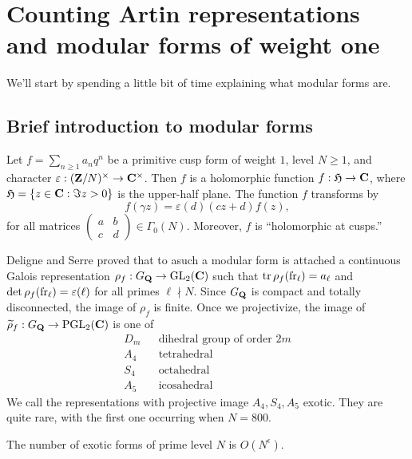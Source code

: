 
\section{Counting Artin representations and modular forms of weight one}





We'll start by spending a little bit of time explaining what modular forms are. 





\subsection{Brief introduction to modular forms}

Let $f = \sum_{n\geqslant 1} a_n q^n$ be a primitive cusp form of weight $1$, 
level $N\geqslant 1$, and character 
$\varepsilon:(\mathbf{Z}/N)^\times \to \mathbf{C}^\times$. Then $f$ is a holomorphic function 
$f:\mathfrak{H}\to \mathbf{C}$, where $\mathfrak{H}=\{z\in \mathbf{C}:\Im z>0\}$ is the upper-half plane. The 
function $f$ transforms by 
\[
  f(\gamma z) = \varepsilon(d) (c z+d) f(z) ,
\]
for all matrices $\begin{pmatrix} a & b \\ c & d \end{pmatrix}\in \Gamma_0(N)$. 
Moreover, $f$ is ``holomorphic at cusps.'' 

Deligne and Serre proved that to asuch a modular form is attached a continuous 
Galois representation $\rho_f:G_{\mathbf{Q}} \to \operatorname{GL}_2(\mathbf{C})$ such that 
$\operatorname{tr} \rho_f(\operatorname{fr}_\ell) = a_\ell$ and 
$\det\rho_f(\operatorname{fr}_\ell) = \varepsilon(\ell)$ for all primes $\ell\nmid N$. 
Since $G_{\mathbf{Q}}$ is compact and totally disconnected, the image of $\rho_f$ is 
finite. Once we projectivize, the image of 
$\widetilde\rho_f:G_{\mathbf{Q}}\to \operatorname{PGL}_2(\mathbf{C})$ is one of 
\begin{align*}
  D_m && \text{dihedral group of order }2m \\
  A_4 && \text{tetrahedral} \\
  S_4 && \text{octahedral} \\
  A_5 && \text{icosahedral}
\end{align*}
We call the representations with projective image $A_4,S_4,A_5$ exotic. They 
are quite rare, with the first one occurring when $N=800$. 

\begin{conjecture}
The number of exotic forms of prime level $N$ is $O(N^\epsilon)$. 
\end{conjecture}

